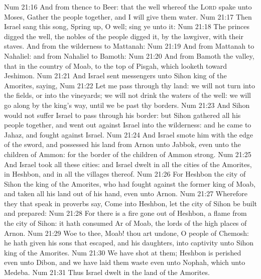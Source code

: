 \vs Num 21:16 And from thence  to Beer: that  the well whereof the \textsc{Lord} spake unto Moses, Gather the people together, and I will give them water.
\vs Num 21:17 Then Israel sang this song, Spring up, O well; sing ye unto it:
\vs Num 21:18 The princes digged the well, the nobles of the people digged it, by  the lawgiver, with their staves. And from the wilderness  to Mattanah:
\vs Num 21:19 And from Mattanah to Nahaliel: and from Nahaliel to Bamoth:
\vs Num 21:20 And from Bamoth  the valley, that  in the country of Moab, to the top of Pisgah, which looketh toward Jeshimon.
\vs Num 21:21 And Israel sent messengers unto Sihon king of the Amorites, saying,
\vs Num 21:22 Let me pass through thy land: we will not turn into the fields, or into the vineyards; we will not drink  the waters of the well:  we will go along by the king's  way, until we be past thy borders.
\vs Num 21:23 And Sihon would not suffer Israel to pass through his border: but Sihon gathered all his people together, and went out against Israel into the wilderness: and he came to Jahaz, and fought against Israel.
\vs Num 21:24 And Israel smote him with the edge of the sword, and possessed his land from Arnon unto Jabbok, even unto the children of Ammon: for the border of the children of Ammon  strong.
\vs Num 21:25 And Israel took all these cities: and Israel dwelt in all the cities of the Amorites, in Heshbon, and in all the villages thereof.
\vs Num 21:26 For Heshbon  the city of Sihon the king of the Amorites, who had fought against the former king of Moab, and taken all his land out of his hand, even unto Arnon.
\vs Num 21:27 Wherefore they that speak in proverbs say, Come into Heshbon, let the city of Sihon be built and prepared:
\vs Num 21:28 For there is a fire gone out of Heshbon, a flame from the city of Sihon: it hath consumed Ar of Moab,  the lords of the high places of Arnon.
\vs Num 21:29 Woe to thee, Moab! thou art undone, O people of Chemosh: he hath given his sons that escaped, and his daughters, into captivity unto Sihon king of the Amorites.
\vs Num 21:30 We have shot at them; Heshbon is perished even unto Dibon, and we have laid them waste even unto Nophah, which  unto Medeba.
\vs Num 21:31 Thus Israel dwelt in the land of the Amorites.
